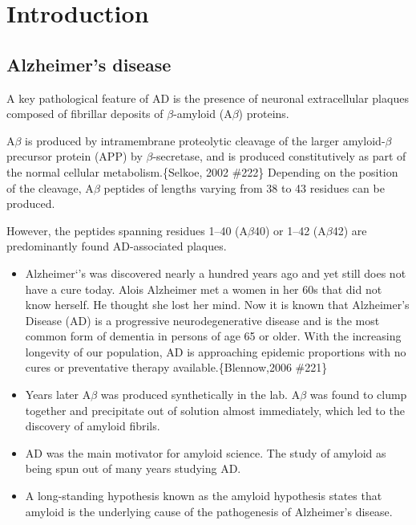 \chapter{Introduction}
\section{Alzheimer's disease} %

A key pathological feature of AD is the presence of neuronal extracellular plaques composed of fibrillar deposits of $\beta$-amyloid (A$\beta$) proteins. 

A$\beta$ is produced by intramembrane proteolytic cleavage of the larger amyloid-$\beta$ precursor protein (APP) by $\beta$-secretase, and is produced constitutively as part of the normal cellular metabolism.\{Selkoe, 2002 \#222\} Depending on the position of the cleavage, A$\beta$ peptides of lengths varying from 38 to 43 residues can be produced. 

However, the peptides spanning residues 1--40 (A$\beta$40) or 1--42 (A$\beta$42) are predominantly found AD-associated plaques.


\begin{itemize}
  \item Alzheimer`'s was discovered nearly a hundred years ago and yet still does not have a cure today.  Alois Alzheimer met a women in her 60s that did not know herself.  He thought she lost her mind. Now it is known that Alzheimer's Disease (AD) is a progressive neurodegenerative disease and is the most common form of dementia in persons of age 65 or older. With the increasing longevity of our population, AD is approaching epidemic proportions with no cures or preventative therapy available.\{Blennow,2006 \#221\}
  
  \item Years later A$\beta$ was produced synthetically in the lab. A$\beta$ was found to clump together and precipitate out of solution almost immediately, which led to the discovery of amyloid fibrils.
  
  \item AD was the main motivator for amyloid science. The study of amyloid as being spun out of many years studying AD.
  
  \item A long-standing hypothesis known as the amyloid hypothesis states that amyloid is the underlying cause of the pathogenesis of Alzheimer's disease. 
\end{itemize}

